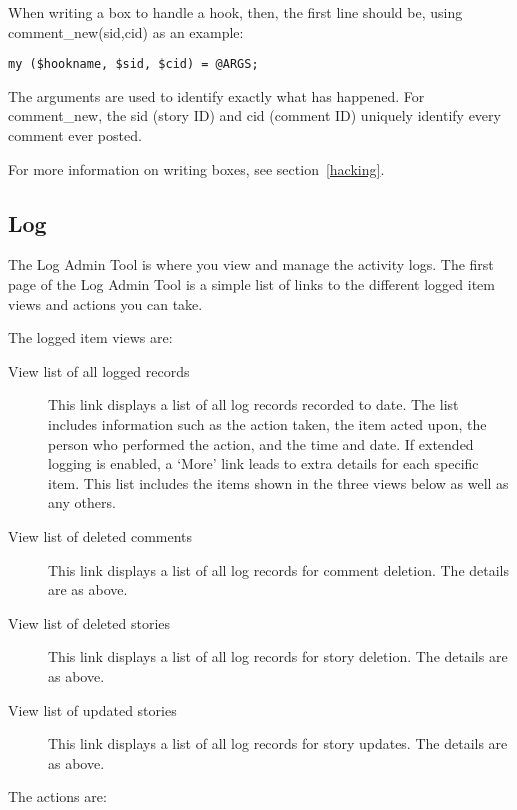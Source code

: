 When writing a box to handle a hook, then, the first line should be, using comment\_new(sid,cid) as an example:

\begin{verbatim}
my ($hookname, $sid, $cid) = @ARGS;
\end{verbatim}

The arguments are used to identify exactly what has happened. For comment\_new, the sid (story ID) and cid (comment ID) uniquely identify every comment ever posted.

For more information on writing boxes, see section~\ref{hacking}.

\subsection{Log}
\label{admin-tools-log}

The Log Admin Tool is where you view and manage the activity logs. The first page of the Log Admin Tool is a simple list of links to the different logged item views and actions you can take.

The logged item views are:

\begin{description}
\item[View list of all logged records] This link displays a list of all log records recorded to date. The list includes information such as the action taken, the item acted upon, the person who performed the action, and the time and date. If extended logging is enabled, a `More' link leads to extra details for each specific item. This list includes the items shown in the three views below as well as any others.
\item[View list of deleted comments] This link displays a list of all log records for comment deletion. The details are as above.
\item[View list of deleted stories] This link displays a list of all log records for story deletion. The details are as above.
\item[View list of updated stories] This link displays a list of all log records for story updates. The details are as above.
\end{description}

The actions are:

